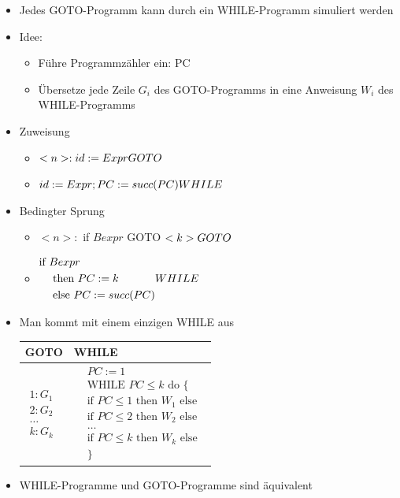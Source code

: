 \documentclass{scrartcl}
\begin{document}
\begin{itemize}
	\item Jedes GOTO-Programm kann durch ein WHILE-Programm simuliert werden
	\item Idee:
	\begin{itemize}
		\item Führe Programmzähler ein: PC
		\item Übersetze jede Zeile $G_i$ des GOTO-Programms in eine Anweisung $W_i$ des WHILE-Programms
	\end{itemize}
	\item Zuweisung
	\begin{itemize}
		\item $<n>: id := Expr \hfill GOTO$
		\item $id := Expr; PC := succ(PC) \hfill WHILE$
	\end{itemize}
	\item Bedingter Sprung
	\begin{itemize}
		\item $<n>:$ if $Bexpr$ GOTO $<k> \hfill GOTO$
		\item $\begin{aligned}
			\text{if } & Bexpr \\
			& \text{ then } PC := k \\
			& \text{ else } PC := succ(PC)
		\end{aligned} \hfill WHILE$
	\end{itemize}
	\item Man kommt mit einem einzigen WHILE aus \\
	\renewcommand{\arraystretch}{1.2}
	\begin{tabular}{|l|l|}
	\hline 
	GOTO & WHILE \\ 
	\hline 
	$\begin{aligned}
		1: G_1 \\
		2: G_2 \\
		\ldots \\
		k: G_k
	\end{aligned}$ & $\begin{aligned}
		& PC := 1 \\
		& \text{WHILE } PC \leq k \text{ do } \{ \\
		& \text{if } PC \leq 1 \text{ then } W_1 \text{ else } \\
		& \text{if } PC \leq 2 \text{ then } W_2 \text{ else } \\
		& \ldots  \\
		& \text{if } PC \leq k \text{ then } W_k \text{ else } \\
		& \}
	\end{aligned}$ \\ 
	\hline 
	\end{tabular} 
	\item WHILE-Programme und GOTO-Programme sind äquivalent
\end{itemize}
\end{document}
